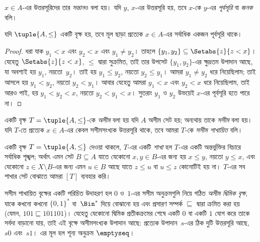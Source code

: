 \documentclass[../../../include/open-logic-section]{subfiles}
\begin{document}
$x \in A$-এর উত্তরসূরিদের তার \emph{সন্তান}ও বলা হয়। যদি $y$, $x$-এর উত্তরসূরি হয়, তবে $x$-কে $y$-এর \emph{পূর্বসূরি} বা \emph{জনক} বলি।

\begin{prop}
যদি $\tuple{A,\le}$ একটি বৃক্ষ হয়, তবে মূল ছাড়া প্রত্যেক $x \in A$-এর সর্বাধিক একজন পূর্বসূরি থাকে।
\end{prop}

\begin{proof}
  ধরা যাক $y_1 < x$ এবং $y_2 < x$ এবং $y_1 \neq y_2$। তাহলে $\{y_1, y_2\} \subseteq \Setabs{z}{z<x}$। যেহেতু $\Setabs{z}{z<x}$, $\le$ দ্বারা সুক্রমিত, তাই তার উপসেট $\{y_1, y_2\}$-এর ক্ষুদ্রতম উপাদান আছে, যা অবশ্যই হয় $y_1$, নয়তো~$y_2$। তাই হয় $y_1 \le y_2$, নয়তো $y_2 \le y_1$। আমরা $y_1 \neq y_2$ ধরে নিয়েছিলাম; তাই আসলে হয় $y_1 < y_2$, নয়তো $y_2 < y_1$। আবার যেহেতু আমরা $y_1 < x$ এবং $y_2 < x$ ধরে নিয়েছিলাম, তাই আরও পাই, হয় $y_1 < y_2 < x$, নয়তো $y_2 < y_1 < x$। সুতরাং $y_1$ ও $y_2$ উভয়েই $x$-এর পূর্বসূরি হতে পারে না।
\end{proof}

\begin{defn}
একটি বৃক্ষ $T = \tuple{A, \le}$-কে \emph{অসীম} বলা হয় যদি $A$ অসীম সেট হয়; অন্যথায় তাকে \emph{সসীম} বলা হয়। যদি $T$-তে প্রত্যেক $x \in A$-এর কেবল সসীমসংখ্যক উত্তরসূরি থাকে, তবে আমরা $T$-কে \emph{সসীম শাখায়িত} বলি।
\end{defn}

\begin{defn}[শাখা]
একটি বৃক্ষ $T = \tuple{A, \le}$ দেওয়া থাকলে, $T$-এর একটি \emph{শাখা} হল $T$-এর একটি অন্তর্ভুক্তির বিচারে সর্বাধিক শৃঙ্খল; অর্থাৎ এমন সেট $B \subseteq A$ যাতে যেকোনো $x, y \in B$-এর জন্য হয় $x \le y$, নয়তো $y \le x$, এবং যেকোনো $z \in X \setminus B$-এর জন্য এমন $u \in B$ আছে যাতে $z \le u$ বা $u \le z$ কোনোটিই হয় না।
%
$T$-এর সব শাখার সেট বোঝাতে আমরা $[T]$ ব্যবহার করি।
\end{defn}

\begin{ex}
সসীম শাখায়িত বৃক্ষের একটি পরিচিত উদাহরণ হল $0$ ও~$1$-এর সসীম অনুক্রমগুলি নিয়ে গঠিত \emph{অসীম দ্বিমিক বৃক্ষ}, যাকে কখনো কখনো $\{0,1\}^*$ বা~$\Bin^*$ দিয়ে বোঝানো হয় এবং প্রসারণ সম্পর্ক $\sqsubseteq$ দ্বারা ক্রমিত করা হয় (যেমন, $101 \sqsubseteq 101101$)। যেহেতু যেকোনো দ্বিমিক প্রতীকক্রমের শেষে একটি $0$ বা একটি $1$ যোগ করে তাকে সর্বদা বাড়ানো যায়, তাই এই বৃক্ষে অসীমসংখ্যক উপাদান আছে: প্রত্যেক উপাদান~$s$-এর ঠিক দুটি উত্তরসূরি আছে, $s0$ এবং~$s1$। এর মূল হল শূন্য অনুক্রম $\emptyseq$।
\end{ex}
\end{document}
